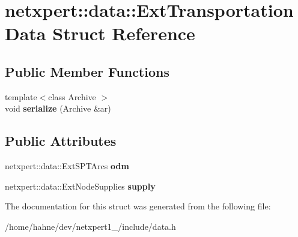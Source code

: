 \hypertarget{structnetxpert_1_1data_1_1ExtTransportationData}{}\section{netxpert\+:\+:data\+:\+:Ext\+Transportation\+Data Struct Reference}
\label{structnetxpert_1_1data_1_1ExtTransportationData}
\subsection*{Public Member Functions}
\begin{DoxyCompactItemize}
\item 
{\footnotesize template$<$class Archive $>$ }\\void {\bfseries serialize} (Archive \&ar)\hypertarget{structnetxpert_1_1data_1_1ExtTransportationData_a89f3a53b514bb3a1b5859e3561ac295f}{}\label{structnetxpert_1_1data_1_1ExtTransportationData_a89f3a53b514bb3a1b5859e3561ac295f}

\end{DoxyCompactItemize}
\subsection*{Public Attributes}
\begin{DoxyCompactItemize}
\item 
netxpert\+::data\+::\+Ext\+S\+P\+T\+Arcs {\bfseries odm}\hypertarget{structnetxpert_1_1data_1_1ExtTransportationData_a0d58e4a34c31679a87e411a5059a22f4}{}\label{structnetxpert_1_1data_1_1ExtTransportationData_a0d58e4a34c31679a87e411a5059a22f4}

\item 
netxpert\+::data\+::\+Ext\+Node\+Supplies {\bfseries supply}\hypertarget{structnetxpert_1_1data_1_1ExtTransportationData_a60dc77c5bf8dc0e33c7eb447c6cf7e08}{}\label{structnetxpert_1_1data_1_1ExtTransportationData_a60dc77c5bf8dc0e33c7eb447c6cf7e08}

\end{DoxyCompactItemize}


The documentation for this struct was generated from the following file\+:\begin{DoxyCompactItemize}
\item 
/home/hahne/dev/netxpert1\+\_/include/data.\+h\end{DoxyCompactItemize}

